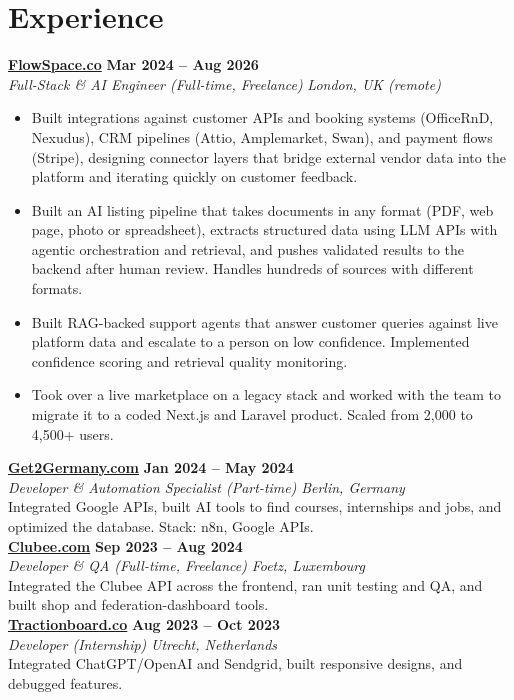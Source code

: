 \documentclass[a4paper,10pt]{article}
\newcommand{\role}[4]{%
 \textbf{#1} \hfill \textbf{#2}\\[1pt]%
 \textit{#3} \hfill \textit{#4}\\[2pt]%
}
\begin{document}
\section{Experience}

\role{\href{https://flowspace.co}{FlowSpace.co}}{Mar 2024 -- Aug 2026}{Full-Stack \& AI Engineer (Full-time, Freelance)}{London, UK (remote)}
\begin{itemize}
 \item Built integrations against customer APIs and booking systems (OfficeRnD, Nexudus), CRM pipelines (Attio, Amplemarket, Swan), and payment flows (Stripe), designing connector layers that bridge external vendor data into the platform and iterating quickly on customer feedback.
 \item Built an AI listing pipeline that takes documents in any format (PDF, web page, photo or spreadsheet), extracts structured data using LLM APIs with agentic orchestration and retrieval, and pushes validated results to the backend after human review. Handles hundreds of sources with different formats.
 \item Built RAG-backed support agents that answer customer queries against live platform data and escalate to a person on low confidence. Implemented confidence scoring and retrieval quality monitoring.
 \item Took over a live marketplace on a legacy stack and worked with the team to migrate it to a coded Next.js and Laravel product. Scaled from 2,000 to 4,500+ users.
\end{itemize}

\role{\href{https://get2germany.com}{Get2Germany.com}}{Jan 2024 -- May 2024}{Developer \& Automation Specialist (Part-time)}{Berlin, Germany}
Integrated Google APIs, built AI tools to find courses, internships and jobs, and optimized the database. Stack: n8n, Google APIs.\\[1pt]

\role{\href{https://clubee.com}{Clubee.com}}{Sep 2023 -- Aug 2024}{Developer \& QA (Full-time, Freelance)}{Foetz, Luxembourg}
Integrated the Clubee API across the frontend, ran unit testing and QA, and built shop and federation-dashboard tools.\\[1pt]

\role{\href{https://tractionboard.co}{Tractionboard.co}}{Aug 2023 -- Oct 2023}{Developer (Internship)}{Utrecht, Netherlands}
Integrated ChatGPT/OpenAI and Sendgrid, built responsive designs, and debugged features.
\end{document}
